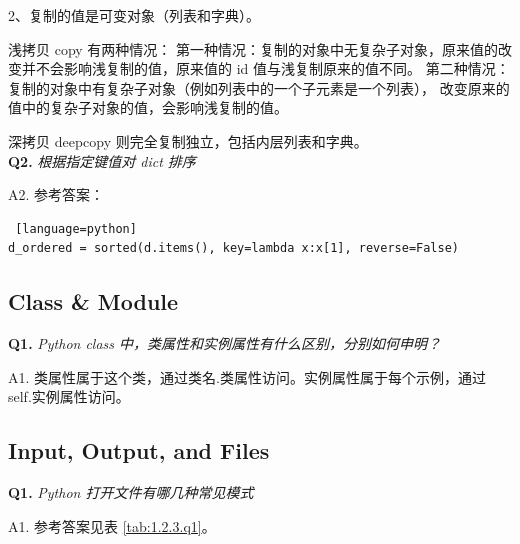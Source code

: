 \documentclass[cn,10pt,math=newtx,citestyle=gb7714-2015,bibstyle=gb7714-2015]{elegantbook}
\begin{document}
2、复制的值是可变对象（列表和字典）。

浅拷贝 copy 有两种情况：
第一种情况：复制的对象中无复杂子对象，原来值的改变并不会影响浅复制的值，原来值的 id 值与浅复制原来的值不同。
第二种情况：复制的对象中有复杂子对象（例如列表中的一个子元素是一个列表）， 改变原来的值中的复杂子对象的值，会影响浅复制的值。

深拷贝 deepcopy 则完全复制独立，包括内层列表和字典。\\


\textbf{Q2.} \textit{根据指定键值对 dict 排序}

A2. 参考答案：

\begin{lstlisting} [language=python]
d_ordered = sorted(d.items(), key=lambda x:x[1], reverse=False)
\end{lstlisting}


\subsection{Class \& Module}

\textbf{Q1.} \textit{Python class 中，类属性和实例属性有什么区别，分别如何申明？}

A1. 类属性属于这个类，通过类名.类属性访问。实例属性属于每个示例，通过 self.实例属性访问。


\subsection{Input, Output, and Files}

\textbf{Q1.} \textit{Python 打开文件有哪几种常见模式}

A1. 参考答案见表 \ref{tab:1.2.3.q1}。
\end{document}
